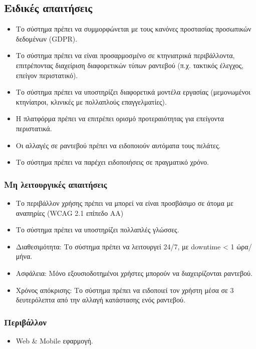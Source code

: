 \documentclass[12pt,a4paper,twoside]{book}
\begin{document}
\subsection{Ειδικές απαιτήσεις} %
\begin{itemize}
  \item Το σύστημα πρέπει να συμμορφώνεται με τους κανόνες προστασίας προσωπικών δεδομένων (GDPR). %
  \item Το σύστημα πρέπει να είναι προσαρμοσμένο σε κτηνιατρικά περιβάλλοντα, επιτρέποντας διαχείριση διαφορετικών τύπων ραντεβού (π.χ. τακτικός έλεγχος, επείγον περιστατικό). %
  \item Το σύστημα πρέπει να υποστηρίζει διαφορετικά μοντέλα εργασίας (μεμονωμένοι κτηνίατροι, κλινικές με πολλαπλούς επαγγελματίες). %
  \item Η πλατφόρμα πρέπει να επιτρέπει ορισμό προτεραιότητας για επείγοντα περιστατικά.
  \item Οι αλλαγές σε ραντεβού πρέπει να ειδοποιούν αυτόματα τους πελάτες. %
  \item Το σύστημα πρέπει να παρέχει ειδοποιήσεις σε πραγματικό χρόνο. %
\end{itemize}

\subsubsection{Μη λειτουργικές απαιτήσεις}
\begin{itemize}
  \item Το περιβάλλον χρήσης πρέπει να μπορεί να  είναι προσβάσιμο σε  άτομα με αναπηρίες (WCAG 2.1 επίπεδο AA) %
  \item Το σύστημα πρέπει να υποστηρίζει πολλαπλές γλώσσες.
  \item Διαθεσιμότητα: Το σύστημα πρέπει να λειτουργεί 24/7, με downtime < 1 ώρα/μήνα.
  \item Ασφάλεια: Μόνο εξουσιοδοτημένοι χρήστες μπορούν να διαχειρίζονται ραντεβού. %
  \item Χρόνος απόκρισης: Το σύστημα πρέπει να ειδοποιεί τον χρήστη μέσα σε 3 δευτερόλεπτα από την αλλαγή κατάστασης ενός ραντεβού. %
\end{itemize}

\subsubsection{Περιβάλλον}
\begin{itemize}
  \item Web \& Mobile εφαρμογή.
\end{itemize}
\end{document}
